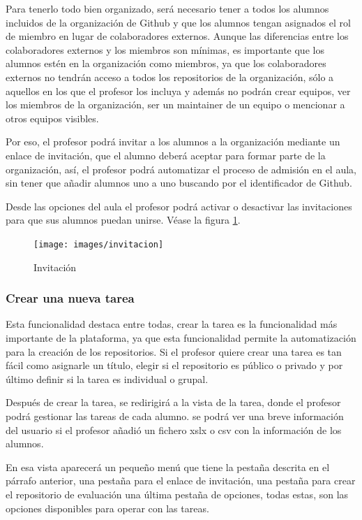 Para tenerlo todo bien organizado, será necesario tener a todos los alumnos incluidos de la organización de Github y que los alumnos tengan asignados el rol de miembro en lugar de colaboradores externos. Aunque las diferencias entre los colaboradores externos y los miembros son mínimas, 
es importante que los alumnos estén en la organización como miembros, ya que los colaboradores externos no tendrán acceso a todos los repositorios de la organización, sólo a aquellos en los que el profesor los incluya y además no podrán crear equipos, 
ver los miembros de la organización, ser un maintainer de un equipo o mencionar a otros equipos visibles.

Por eso, el profesor podrá invitar a los alumnos a la organización mediante un enlace de invitación, que el alumno deberá aceptar para formar parte de la organización, así, el profesor podrá automatizar 
el proceso de admisión en el aula, sin tener que añadir alumnos uno a uno buscando por el identificador de Github.

Desde las opciones del aula el profesor podrá activar o desactivar las invitaciones para que sus alumnos puedan unirse.
Véase la figura \ref{fig:Invitacion}.

\begin{figure}[!th]
\begin{center}
\texttt{[image: images/invitacion]}
\caption{Invitación}
\label{fig:Invitacion}
\end{center}
\end{figure}

\subsubsection{Crear una nueva tarea}

Esta funcionalidad destaca entre todas, crear la tarea es la funcionalidad más importante de la plataforma, ya que esta funcionalidad permite la automatización para la creación de los repositorios.
Si el profesor quiere crear una tarea es tan fácil como asignarle un título, elegir si el repositorio es público o privado y por último definir si la tarea es individual o grupal.

Después de crear la tarea, se redirigirá a la vista de la tarea, donde el profesor podrá gestionar las tareas de cada alumno. se podrá ver una breve información del usuario si el profesor añadió un fichero xslx o csv con la información de los alumnos.

En esa vista aparecerá un pequeño menú que tiene la pestaña descrita en el párrafo anterior, una pestaña para el enlace de invitación, una pestaña para crear el repositorio de evaluación una última pestaña de opciones, todas estas, son las opciones disponibles para operar con las tareas.

